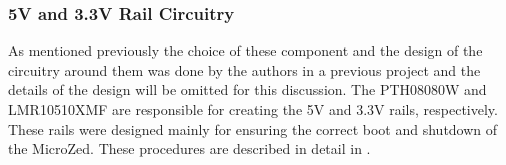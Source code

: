 \subsubsection{5V and 3.3V Rail Circuitry} %
\label{subsub:pth08080w}
As mentioned previously the choice of these component and the design of the circuitry around them was done by the authors in a previous project \cite{isaswarm} and the details of the design will be omitted for this discussion.
The PTH08080W and LMR10510XMF are responsible for creating the 5V and 3.3V rails, respectively.
These rails were designed mainly for ensuring the correct boot and shutdown of the MicroZed.
These procedures are described in detail in \cite{isaswarm}.
